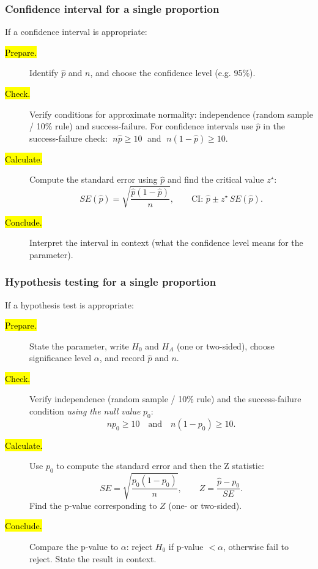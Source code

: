 \documentclass[slidestop,compress,mathserif]{beamer}
\begin{document}

\begin{frame}
\frametitle{Confidence interval for a single proportion}

If a confidence interval is appropriate:

\begin{description}
  \item[\hl{Prepare.}] Identify $\hat{p}$ and $n$, and choose the confidence level (e.g. 95\%).
  \item[\hl{Check.}] Verify conditions for approximate normality: independence (random sample / 10\% rule) and success-failure. For confidence intervals use $\hat{p}$ in the success-failure check: $\;n\hat{p}\ge10\;$ and $\;n(1-\hat{p})\ge10$.
  \item[\hl{Calculate.}] Compute the standard error using $\hat{p}$ and find the critical value $z^\star$:
  \[
    SE(\hat{p})=\sqrt{\dfrac{\hat{p}(1-\hat{p})}{n}}, \qquad
    \text{CI: }\hat{p}\pm z^\star \,SE(\hat{p}).
  \]
  \item[\hl{Conclude.}] Interpret the interval in context (what the confidence level means for the parameter).
\end{description}

\end{frame}


\begin{frame}
\frametitle{Hypothesis testing for a single proportion}

If a hypothesis test is appropriate:

\begin{small}
\begin{description}
  \item[\hl{Prepare.}] State the parameter, write $H_0$ and $H_A$ (one or two-sided), choose significance level $\alpha$, and record $\hat{p}$ and $n$.
  \item[\hl{Check.}] Verify independence (random sample / 10\% rule) and the success-failure condition \emph{using the null value} $p_0$: \[
    np_0 \ge 10 \quad\text{and}\quad n(1-p_0)\ge 10.
  \]
  \item[\hl{Calculate.}] Use $p_0$ to compute the standard error and then the Z statistic:
  \[
    SE = \sqrt{\dfrac{p_0(1-p_0)}{n}}, \qquad
    Z=\dfrac{\hat{p}-p_0}{SE}.
  \]
  Find the p-value corresponding to $Z$ (one- or two-sided).
  \item[\hl{Conclude.}] Compare the p-value to $\alpha$: reject $H_0$ if p-value $<\alpha$, otherwise fail to reject. State the result in context.
\end{description}
\end{small}
\end{frame}
\end{document}

